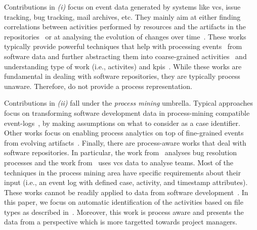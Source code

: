 Contributions in \textit{(i)} focus on event data generated by systems like \gls{vcs}, issue tracking, bug tracking, mail archives, etc. They mainly aim at either finding correlations between activities performed by resources and the artifacts in the repositories~\citep{DBLP:conf/iwpse/OlivaSGS11} or at analysing the evolution of changes over time~\citep{DBLP:journals/tse/ZimmermannWDZ05}. These works typically provide powerful techniques that help with processing events~\citep{DBLP:conf/msr/0001W04} from software data and further abstracting them into coarse-grained activities~\citep{DBLP:conf/iwpse/OlivaSGS11,DBLP:conf/icst/ZaidmanRDD08,DBLP:conf/msr/RodriguezTK18} and 
 understanding type of work (i.e., activites) and \glspl{kpi}~\cite{DBLP:journals/ese/VasilescuSGM14,DBLP:conf/msr/JoonbakhshS18}.
While these works are fundamental in dealing with software repositories, they are typically process unaware. Therefore, do not provide a process representation.

Contributions in \textit{(ii)} fall under the \emph{process mining} umbrella. 
Typical approaches focus on transforming software development data in process-mining compatible event-logs~\citep{DBLP:conf/se/KindlerRS06,DBLP:conf/csmr/PoncinSB11}, by making assumptions on what to consider as a case identifier. Other works focus on enabling process analytics on top of fine-grained events from evolving artifacts~\citep{DBLP:conf/caise/BeheshtiBN13}. Finally, there are process-aware works that deal with software repositories. In particular, the work from~\citep{DBLP:conf/wecwis/MarquesSF18} analyses bug resolution processes and the work from~\citep{DBLP:conf/bpm/JookenCJ19} uses \gls{vcs} data to analyse teams. Most of the techniques in the process mining area have specific requirements about their input (i.e., an event log with defined case, activity, and timestamp attributes). These works cannot be readily applied to data from software development~\citep{DBLP:conf/er/TsourySR18}. 
In this paper, we focus on automatic identification of the activities based on file types as described in~\citep{DBLP:journals/ese/VasilescuSGM14}. Moreover, this work is process aware and presents the data from a perspective which is more targetted towards project managers.

